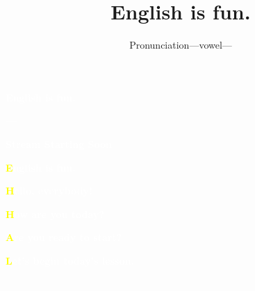 \documentclass[aspectratio=169, xcolor={dvipsnames,table}]{beamer}
\title{English is fun.}
\subtitle{Pronunciation---vowel---}
\author{}
\institute[]{}
\date[]
\makeatletter
\newcommand*{\themonth}{\two@digits\month}
\newcommand*{\theday}{\two@digits\day}
\newcommand{\mytoday}{{\the\year}--{\themonth}--{\theday}}
\makeatother
\begin{document}
\begin{frame}
  \raggedleft \textcolor{white}{\Huge\bfseries English is fun.}

  \vfill

  \raggedleft
  \textcolor{white}{\LARGE\bfseries \mytoday}

  \vfill
  \vfill
  \vfill

  \raggedleft
  \textcolor{white}{\Huge\bfseries Stream Starting Soon}

  \hyperlink{today}{}%
\end{frame}
\begin{frame}
  \raggedleft \textcolor{white}{\Huge\bfseries \textcolor{yellow}{E}nglish is fun.}

  \vfill

  \vfill

  \raggedleft \textcolor{white}{\LARGE\bfseries \textcolor{yellow}{H}ello, everybody!}

  \textcolor{white}{\LARGE\bfseries \textcolor{yellow}{H}ow are you today?}

  \raggedleft \textcolor{white}{\LARGE\bfseries \textcolor{yellow}{A}re you ready to start?}

  \textcolor{white}{\LARGE\bfseries \textcolor{yellow}{L}et's begin today's lesson.}

  \vfill

  \raggedleft
  \textcolor{white}{\Large \bfseries \mytoday}



\end{frame}
\end{document}
